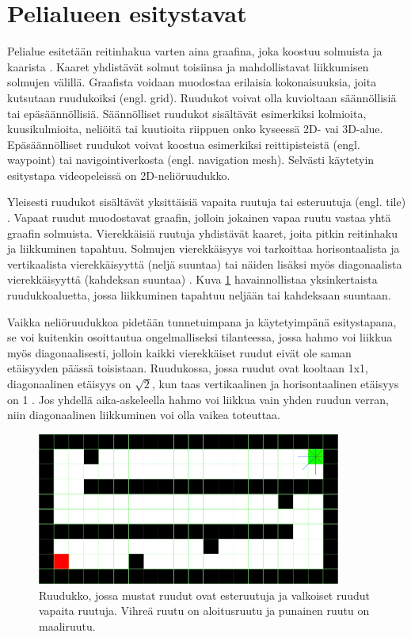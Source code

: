 \documentclass[utf8]{gradu3}
\begin{document}
\section{Pelialueen esitystavat}

Pelialue esitetään reitinhakua varten aina graafina, joka koostuu solmuista ja kaarista \parencite{lawande2022systematic}. Kaaret yhdistävät solmut toisiinsa ja mahdollistavat liikkumisen solmujen välillä. Graafista voidaan muodostaa erilaisia kokonaisuuksia, joita kutsutaan ruudukoiksi (engl. grid). Ruudukot voivat olla kuvioltaan säännöllisiä tai epäsäännöllisiä. Säännölliset ruudukot sisältävät esimerkiksi kolmioita, kuusikulmioita, neliöitä tai kuutioita riippuen onko kyseessä 2D- vai 3D-alue. Epäsäännölliset ruudukot voivat koostua esimerkiksi reittipisteistä (engl. waypoint) tai navigointiverkosta (engl. navigation mesh). Selvästi käytetyin esitystapa videopeleissä on 2D-neliöruudukko.

Yleisesti ruudukot sisältävät yksittäisiä vapaita ruutuja tai esteruutuja (engl. tile) \parencite{botea2013pathfinding}. Vapaat ruudut muodostavat graafin, jolloin jokainen vapaa ruutu vastaa yhtä graafin solmuista. Vierekkäisiä ruutuja yhdistävät kaaret, joita pitkin reitinhaku ja liikkuminen tapahtuu. Solmujen vierekkäisyys voi tarkoittaa horisontaalista ja vertikaalista vierekkäisyyttä (neljä suuntaa) tai näiden lisäksi myös diagonaalista vierekkäisyyttä (kahdeksan suuntaa) \parencite{abd2015comprehensive,botea2013pathfinding}. Kuva \ref{ruudukkokuva} havainnollistaa yksinkertaista ruudukkoaluetta, jossa liikkuminen tapahtuu neljään tai kahdeksaan suuntaan.

Vaikka neliöruudukkoa pidetään tunnetuimpana ja käytetyimpänä esitystapana, se voi kuitenkin osoittautua ongelmalliseksi tilanteessa, jossa hahmo voi liikkua myös diagonaalisesti, jolloin kaikki vierekkäiset ruudut eivät ole saman etäisyyden päässä toisistaan. Ruudukossa, jossa ruudut ovat kooltaan 1x1, diagonaalinen etäisyys on $\sqrt{2}$, kun taas vertikaalinen ja horisontaalinen etäisyys on 1 \parencite{panov2018grid}. Jos yhdellä aika-askeleella hahmo voi liikkua vain yhden ruudun verran, niin diagonaalinen liikkuminen voi olla vaikea toteuttaa.

\begin{figure}[h]
\centering
\includegraphics[width=10cm]{ruudukko_kuva.png}
\caption{Ruudukko, jossa mustat ruudut ovat esteruutuja ja valkoiset ruudut vapaita ruutuja. Vihreä ruutu on aloitusruutu ja punainen ruutu on maaliruutu.}
\label{ruudukkokuva}
\end{figure}
\end{document}
